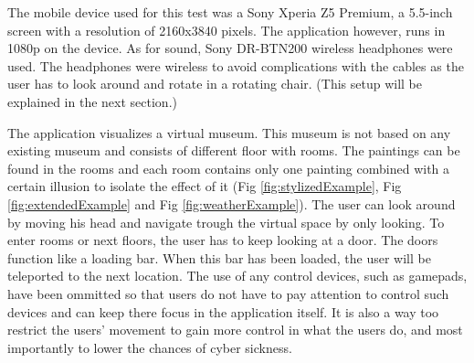 \documentclass[a4paper]{article}
\begin{document}
The mobile device used for this test was a Sony Xperia Z5 Premium, a 5.5-inch screen with a resolution of 2160x3840 pixels. The application however, runs in 1080p on the device. As for sound, Sony DR-BTN200 wireless headphones were used. The headphones were wireless to avoid complications with the cables as the user has to look around and rotate in a rotating chair. (This setup will be explained in the next section.)

The application visualizes a virtual museum. This museum is not based on any existing museum and consists of different floor with rooms. The paintings can be found in the rooms and each room contains only one painting combined with a certain illusion to isolate the effect of it (Fig \ref{fig:stylizedExample}, Fig \ref{fig:extendedExample} and Fig \ref{fig:weatherExample}). The user can look around by moving his head and navigate trough the virtual space by only looking. To enter rooms or next floors, the user has to keep looking at a door. The doors function like a loading bar. When this bar has been loaded, the user will be teleported to the next location. The use of any control devices, such as gamepads, have been ommitted so that users do not have to pay attention to control such devices and can keep there focus in the application itself. It is also a way too restrict the users' movement to gain more control in what the users do, and most importantly to lower the chances of cyber sickness.

\end{document}
